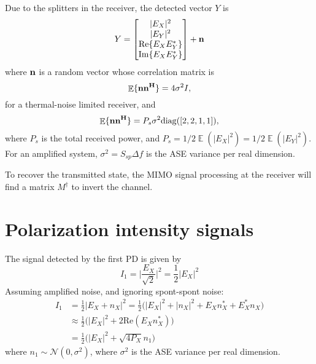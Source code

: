 \documentclass[a4paper]{article}
\DeclareMathOperator{\E}{\mathbb{E}}
\begin{document}

Due to the splitters in the receiver, the detected vector $Y$ is
\begin{equation}
Y= \begin{bmatrix}
|E_X|^2 \\
|E_Y|^2 \\
\mathrm{Re}\{E_XE_Y^*\} \\
\mathrm{Im}\{E_XE_Y^*\}
\end{bmatrix} + \bf{n}
\end{equation}
where $\bf{n}$ is a random vector whose correlation matrix is
\begin{equation}
\E\{{\bf nn^H}\} = 4\sigma^2I,
\end{equation}
for a thermal-noise limited receiver, and 
\begin{equation}
\E\{{\bf nn^H}\} = P_s\sigma^2\mathrm{diag}([2, 2, 1, 1]), 
\end{equation}
where $P_s$ is the total received power, and $P_s = 1/2\E(|E_X|^2) = 1/2\E(|E_Y|^2)$. For an amplified system, $\sigma^2 = S_{sp}\Delta f$ is the ASE variance per real dimension.

To recover the transmitted state, the MIMO signal processing at the receiver will find a matrix $M^{\dagger}$ to invert the channel. 


\section{Polarization intensity signals}

The signal detected by the first PD is given by
\begin{equation}
I_1 = \Big|\frac{E_X}{\sqrt{2}}\Big|^2 = \frac{1}{2}|E_X|^2
\end{equation}
Assuming amplified noise, and ignoring spont-spont noise:
\begin{align} \nonumber
I_1 &= \frac{1}{2}|E_X + n_X|^2 = \frac{1}{2}\Big(|E_X|^2 + |n_X|^2 + E_Xn_X^* + E_X^*n_X\Big) \\ \nonumber
&\approx\frac{1}{2}\Big(|E_X|^2 + 2\mathrm{Re}(E_Xn_X^*)\Big)  \\
&=\frac{1}{2}\Big(|E_X|^2 + \sqrt{4P_X}n_1\Big)
\end{align}
where $n_1 \sim\mathcal{N}(0, \sigma^2)$, where $\sigma^2$ is the ASE variance per real dimension.
\end{document}

